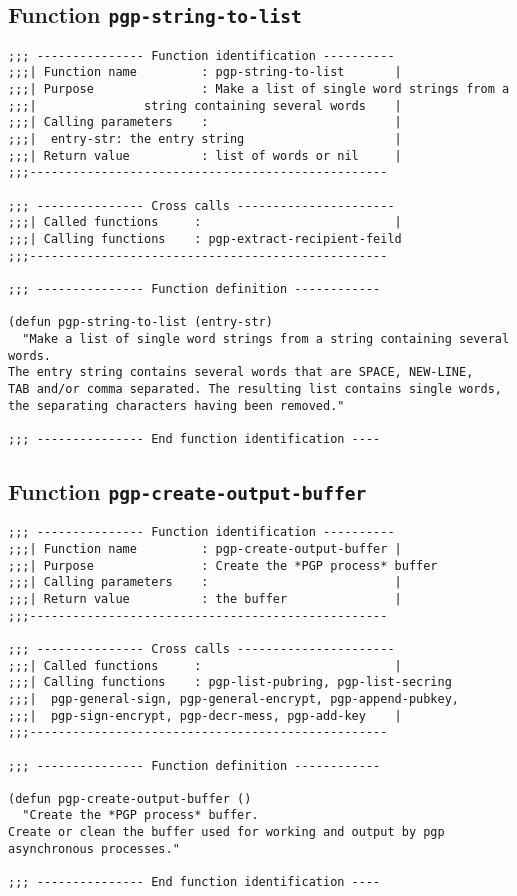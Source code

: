 \subsection{Function {\tt pgp-string-to-list}}
\leavevmode
\begin{verbatim}
;;; --------------- Function identification ----------
;;;| Function name         : pgp-string-to-list       |
;;;| Purpose               : Make a list of single word strings from a
;;;|               string containing several words    |
;;;| Calling parameters    :                          |
;;;|  entry-str: the entry string                     |
;;;| Return value          : list of words or nil     |
;;;--------------------------------------------------

;;; --------------- Cross calls ----------------------
;;;| Called functions     :                           |
;;;| Calling functions    : pgp-extract-recipient-feild
;;;--------------------------------------------------

;;; --------------- Function definition ------------

(defun pgp-string-to-list (entry-str)
  "Make a list of single word strings from a string containing several words.
The entry string contains several words that are SPACE, NEW-LINE, 
TAB and/or comma separated. The resulting list contains single words, 
the separating characters having been removed."

;;; --------------- End function identification ----
\end{verbatim}
\subsection{Function {\tt pgp-create-output-buffer}}
\leavevmode
\begin{verbatim}
;;; --------------- Function identification ----------
;;;| Function name         : pgp-create-output-buffer |
;;;| Purpose               : Create the *PGP process* buffer
;;;| Calling parameters    :                          |
;;;| Return value          : the buffer               |
;;;--------------------------------------------------

;;; --------------- Cross calls ----------------------
;;;| Called functions     :                           |
;;;| Calling functions    : pgp-list-pubring, pgp-list-secring
;;;|  pgp-general-sign, pgp-general-encrypt, pgp-append-pubkey,
;;;|  pgp-sign-encrypt, pgp-decr-mess, pgp-add-key    |
;;;--------------------------------------------------

;;; --------------- Function definition ------------

(defun pgp-create-output-buffer ()
  "Create the *PGP process* buffer.
Create or clean the buffer used for working and output by pgp
asynchronous processes."

;;; --------------- End function identification ----
\end{verbatim}
